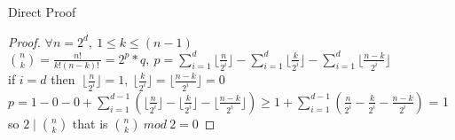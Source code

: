 \item Direct Proof
\begin{proof}
$\displaystyle \forall n = 2^d,~ 1\leq k\leq (n - 1)$\\

$\displaystyle \binom{n}{k} = \frac{n!}{k!(n - k)!~} = 2^{p} * q,~p = \sum_{i = 1}^{d}\lfloor \frac{n}{2^i}\rfloor - \sum_{i = 1}^{d}\lfloor \frac{k}{2^i}\rfloor - \sum_{i = 1}^{d}\lfloor \frac{n - k}{2^i}\rfloor$\\

if $i = d$ then $ ~\lfloor \frac{n}{2^i}\rfloor = 1,~\lfloor \frac{k}{2^i}\rfloor = \lfloor \frac{n - k}{2^i}\rfloor = 0$\\

$\displaystyle p = 1 - 0 - 0 + \sum_{i = 1}^{d - 1}(\lfloor \frac{n}{2^i}\rfloor - \lfloor \frac{k}{2^i}\rfloor - \lfloor \frac{n - k}{2^i}\rfloor)\geq 1  + \sum_{i = 1}^{d - 1}( \frac{n}{2^i} - \frac{k}{2^i} - \frac{n - k}{2^i})$ = 1\\

so $\displaystyle 2 \mid \binom{n}{k}$ that is $\displaystyle \binom{n}{k}~mod~2 = 0$
\end{proof}

